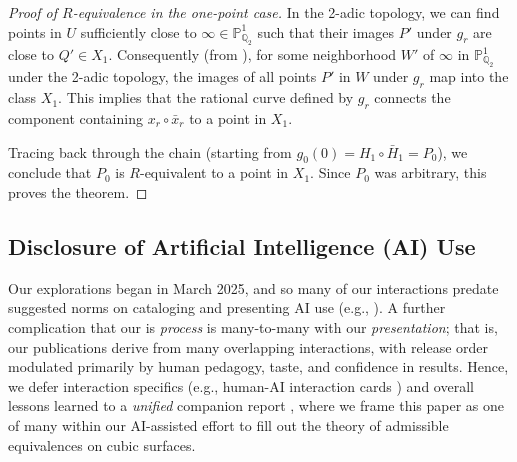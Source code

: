\documentclass[11pt]{article}
\theoremstyle{definition}
\newcommand{\PP}{\mathbb{P}}
\newcommand{\Q}{\mathbb{Q}}
\begin{document}
\begin{proof}[Proof of $R$-equivalence in the one-point case]
 In the 2-adic topology, we can find points in $U$ sufficiently close to $\infty \in \mathbb{P}_{\mathbb{Q}_2}^1$ such that their images $P'$ under $g_r$ are close to $Q' \in X_1$. Consequently (from ), for some neighborhood $W'$ of $\infty$ in $\PP_{\Q_2}^1$ under the 2-adic topology, the images of all points $P'$ in $W$ under $g_r$ map into the class $X_1$. This implies that the rational curve defined by $g_r$ connects the component containing $x_r \circ \bar{x}_r$ to a point in $X_1$.

Tracing back through the chain (starting from $g_0(0) = H_1 \circ \bar{H}_1 = P_0$), we conclude that $P_0$ is $R$-equivalent to a point in $X_1$. Since $P_0$ was arbitrary, this proves the theorem.
\end{proof}

\begin{ai}
\section{Disclosure of Artificial Intelligence (AI) Use}
\label{sec:ai-assist}

Our explorations began in March 2025, and so many of our interactions predate suggested norms on cataloging and presenting AI use (e.g., \cite{schmitt2025extremal, feng2026aletheia}). A further complication that our is \textit{process} is many-to-many with our \textit{presentation}; that is, our publications derive from many overlapping interactions, with release order modulated primarily by human pedagogy, taste, and confidence in results. Hence, we defer interaction specifics (e.g., human-AI interaction cards \cite{feng2026aletheia}) and overall lessons learned to a \textit{unified} companion report \cite{aireport}, where we frame this paper as one of many within our AI-assisted effort to fill out the theory of admissible equivalences on cubic surfaces.


\end{ai}
\end{document}
